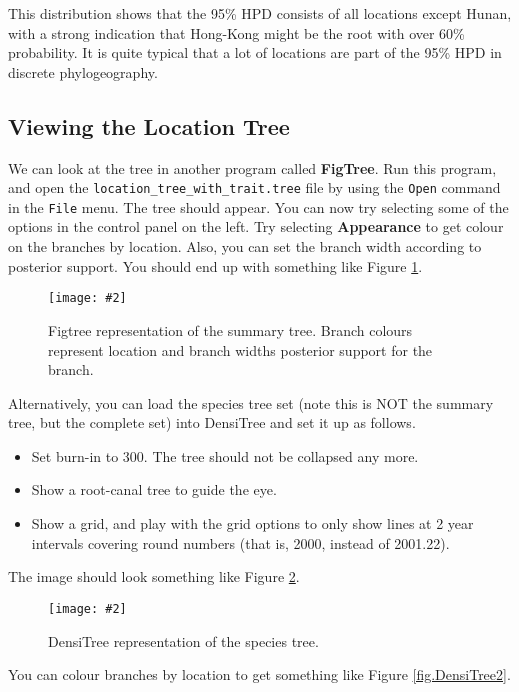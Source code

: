\documentclass{article}
\newcommand{\includeimage}[2][]{%
\texttt{[image: \#2]}
}
\newcommand{\LocationTree}{{\texttt{location\_tree\_with\_trait.tree}}}
\begin{document}
This distribution shows that the 95\% HPD consists of all locations except Hunan, with a 
strong indication that Hong-Kong might be the root with over 60\% probability. It is quite
typical that a lot of locations are part of the 95\% HPD in discrete phylogeography.

\subsection*{Viewing the Location Tree}

We can look at the tree in another program called {\bf FigTree}. Run this program, and open
the \LocationTree{} file by using the \texttt{Open} command in the \texttt{File} menu. The tree should appear.
You can now try selecting some of the options in the control panel on the left. Try selecting
{\bf Appearance} to get colour on the branches by location. Also, you can set the branch width
according to posterior support. You should end up with something like Figure \ref{fig.figtree}.

\begin{figure}
\centering
\includeimage[scale=0.4]{figures/figtree}
\caption{Figtree representation of the summary tree. Branch colours represent location
and branch widths posterior support for the branch.}
\label{fig.figtree} 
\end{figure}


Alternatively, you can load the species tree set (note this is NOT the summary tree, but the complete set) into DensiTree and set it up as follows.

\begin{itemize}
\item Set burn-in to 300. The tree should not be collapsed any more.
\item Show a root-canal tree to guide the eye. 
\item Show a grid, and play with the grid options to only show lines at 2 year intervals covering round numbers (that is, 2000, instead of 2001.22).
\end{itemize}

The image should look something like Figure \ref{fig.DensiTree}.

\begin{figure}
\centering
\includeimage[scale=0.4]{figures/DensiTree}
\caption{DensiTree representation of the species tree.}
\label{fig.DensiTree} 
\end{figure}

You can colour branches by location to get something like Figure \ref{fig.DensiTree2}.
\end{document}
